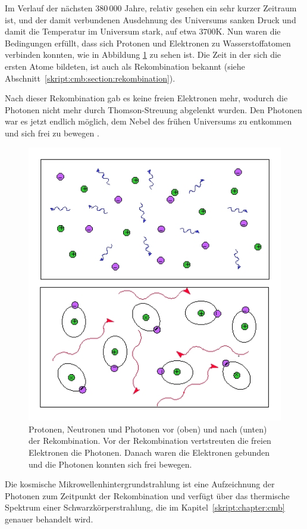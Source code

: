 Im Verlauf der nächsten 380\,000 Jahre, relativ gesehen ein sehr kurzer 
Zeitraum ist, und der damit verbundenen Ausdehnung des Universums sanken Druck 
und damit die Temperatur im Universum stark, auf etwa $3700 \text{K}$.
Nun waren die Bedingungen erfüllt, dass sich Protonen und Elektronen zu 
Wasserstoffatomen verbinden konnten, wie in Abbildung \ref{fig:recombination} 
zu sehen ist. Die Zeit in der sich die ersten Atome bildeten, ist auch als 
Rekombination bekannt (siehe Abschnitt~\ref{skript:cmb:section:rekombination}).

Nach dieser Rekombination gab es keine freien Elektronen mehr, wodurch die 
Photonen nicht mehr durch Thomson-Streuung abgelenkt wurden.
Den Photonen war es jetzt endlich möglich, dem Nebel des frühen Universums zu 
entkommen und sich frei zu bewegen \cite{cmb:recombination}.
\begin{figure}
	\centering
	\includegraphics[scale=0.5]{cmb/images/recombination.jpg}
	\caption{Protonen, Neutronen und Photonen vor (oben) und nach (unten) der 
		Rekombination. Vor der Rekombination vertstreuten die freien Elektronen 
		die Photonen. Danach waren die Elektronen gebunden und die Photonen 
		konnten sich frei bewegen.}
	\label{fig:recombination}
\end{figure}
Die kosmische Mikrowellenhintergrundstrahlung ist eine Aufzeichnung der 
Photonen zum Zeitpunkt der Rekombination und verfügt über das thermische 
Spektrum einer Schwarzkörperstrahlung, die im Kapitel~\ref{skript:chapter:cmb} 
%
genauer behandelt wird.

